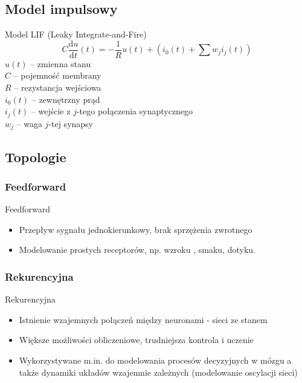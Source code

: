 \documentclass{beamer}
\begin{document}
\subsection{Model impulsowy}
\begin{frame}
  \begin{block}{Model LIF (Leaky Integrate-and-Fire) \cite{Ponulak2011}}
    $$ C\frac{\mathrm{d}u}{\mathrm{d}t} (t) = -\frac1Ru(t)+\left(i_0(t) + \sum{w_ji_j(t)}\right)$$ 
    $u(t)$ -- zmienna stanu \\ 
    $C$ -- pojemność membrany \\
    $R$ -- rezystancja wejściowa\\
    $i_0(t)$ -- zewnętrzny prąd \\
    $i_j(t)$ -- wejście z $j$-tego połączenia synaptycznego\\
    $w_j$ -- waga $j$-tej synapsy
  \end{block}
\end{frame}
\subsection{Topologie}
\subsubsection{Feedforward}
\begin{frame}{Feedforward}
\begin{itemize}
	\item Przepływ sygnału jednokierunkowy, brak sprzężenia zwrotnego
	\item Modelowanie prostych receptorów, np. wzroku \cite{Perrinet2004}, smaku, dotyku. 
\end{itemize}
\end{frame}
\subsubsection{Rekurencyjna}
\begin{frame}{Rekurencyjna}
\begin{itemize}
	\item Istnienie wzajemnych połączeń między neuronami - sieci ze stanem
	\item Większe możliwości obliczeniowe, trudniejsza kontrola i uczenie
	\item Wykorzystywane m.in. do modelowania procesów decyzyjnych w mózgu \cite{Wang2008} a także dynamiki układów wzajemnie zależnych (modelowanie oscylacji sieci)
\end{itemize}
\end{frame}
\end{document}
